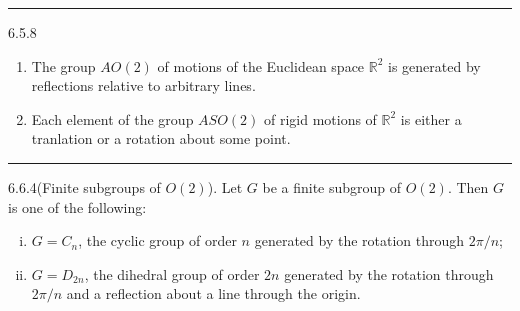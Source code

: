 \documentclass[a4paper, 12pt]{article}
\begin{document}
\noindent\rule{7in}{2.8pt}

\begin{problem}{6.5.8}
\begin{enumerate}[(1)]
\item The group \(AO(2)\) of motions of the Euclidean space \(\mathbb{R}^2\) is generated by reflections relative to arbitrary lines.
\item Each element of the group \(ASO(2)\) of rigid motions of \(\mathbb{R}^2\) is either a tranlation or a rotation about some point.
\end{enumerate}
\end{problem}
\begin{solution}
    
\end{solution}

\noindent\rule{7in}{2.8pt}
\begin{problem}{6.6.4(Finite subgroups of \(O(2)\)).}
Let \(G\) be a finite subgroup of \(O(2)\). Then \(G\) is one of the following:
\begin{enumerate}[(i)]
\item \(G=C_n\), the cyclic group of order \(n\) generated by the rotation through \(2\pi/n\);
\item \(G=D_{2n}\), the dihedral group of order \(2n\) generated by the rotation through \(2\pi/n\) and a reflection about a line through the origin.
\end{enumerate}
\end{problem}
\begin{solution}
    
\end{solution}
\end{document}
